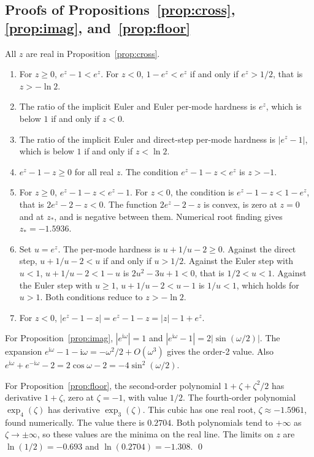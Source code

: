 \documentclass[11pt]{article}
\theoremstyle{definition}
\theoremstyle{remark}
\newcommand{\expt}[1]{\exp_{#1}}         %
\begin{document}
\subsection{Proofs of Propositions~\ref{prop:cross}, \ref{prop:imag}, and~\ref{prop:floor}}\label{app:cross}
All $z$ are real in Proposition~\ref{prop:cross}.
\begin{enumerate}[label=(\alph*)]
\item For $z \ge 0$, $e^z - 1 < e^z$. For $z < 0$, $1 - e^z < e^z$ if and only if $e^z > 1/2$, that is $z > -\ln 2$.
\item The ratio of the implicit Euler and Euler per-mode hardness is $e^z$, which is below $1$ if and only if $z < 0$.
\item The ratio of the implicit Euler and direct-step per-mode hardness is $|e^z - 1|$, which is below $1$ if and only if $z < \ln 2$.
\item $e^z - 1 - z \ge 0$ for all real $z$. The condition $e^z - 1 - z < e^z$ is $z > -1$.
\item For $z \ge 0$, $e^z - 1 - z < e^z - 1$. For $z < 0$, the condition is $e^z - 1 - z < 1 - e^z$, that is $2e^z - 2 - z < 0$. The function $2e^z - 2 - z$ is convex, is zero at $z = 0$ and at $z_\ast$, and is negative between them. Numerical root finding gives $z_\ast = -1.5936$.
\item Set $u = e^z$. The per-mode hardness is $u + 1/u - 2 \ge 0$. Against the direct step, $u + 1/u - 2 < u$ if and only if $u > 1/2$. Against the Euler step with $u < 1$, $u + 1/u - 2 < 1 - u$ is $2u^2 - 3u + 1 < 0$, that is $1/2 < u < 1$. Against the Euler step with $u \ge 1$, $u + 1/u - 2 < u - 1$ is $1/u < 1$, which holds for $u > 1$. Both conditions reduce to $z > -\ln 2$.
\item For $z < 0$, $|e^z - 1 - z| = e^z - 1 - z = |z| - 1 + e^z$.
\end{enumerate}
For Proposition~\ref{prop:imag}, $|e^{\mathrm{i}\omega}| = 1$ and $|e^{\mathrm{i}\omega} - 1| = 2|\sin(\omega/2)|$.
The expansion $e^{\mathrm{i}\omega} - 1 - \mathrm{i}\omega = -\omega^2/2 + O(\omega^3)$ gives the order-2 value.
Also $e^{\mathrm{i}\omega} + e^{-\mathrm{i}\omega} - 2 = 2\cos\omega - 2 = -4\sin^2(\omega/2)$.

For Proposition~\ref{prop:floor}, the second-order polynomial $1 + \zeta + \zeta^2/2$ has derivative $1 + \zeta$, zero at $\zeta = -1$, with value $1/2$.
The fourth-order polynomial $\expt{4}(\zeta)$ has derivative $\expt{3}(\zeta)$.
This cubic has one real root, $\zeta \approx -1.5961$, found numerically.
The value there is $0.2704$.
Both polynomials tend to $+\infty$ as $\zeta \to \pm\infty$, so these values are the minima on the real line.
The limits on $z$ are $\ln(1/2) = -0.693$ and $\ln(0.2704) = -1.308$. \qed
\end{document}
